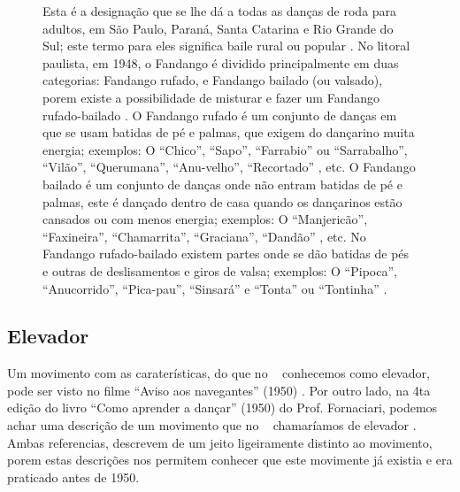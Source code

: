 \begin{figure}[t]
\begin{elaboracion}[title=Fandango]

Esta é a designação que se lhe dá a todas as danças de 
roda para adultos, em São Paulo, Paraná, Santa Catarina e Rio Grande do Sul;
este termo para eles significa baile rural ou popular \cite[pp. 261]{marcondes1977enciclopedia}.
No litoral paulista, em 1948, o Fandango é dividido principalmente em duas categorias: Fandango rufado, 
e Fandango bailado (ou valsado), porem existe a possibilidade de 
misturar e fazer um Fandango rufado-bailado \cite[pp. 48-49]{fandangoSP}.
O Fandango rufado é um conjunto de danças em que se usam batidas de pé e palmas, 
que exigem do dançarino muita energia; exemplos: O ``Chico'', ``Sapo'', 
``Farrabio'' ou ``Sarrabalho'', ``Vilão'', ``Querumana'', ``Anu-velho'', ``Recortado'' \cite[pp. 48-49]{fandangoSP}, 
etc.
O Fandango bailado é um conjunto de danças onde  não entram batidas de pé e palmas,
este é dançado dentro de casa quando os dançarinos estão cansados ou com menos energia;
exemplos: O ``Manjericão'', ``Faxineira'', ``Chamarrita'', ``Graciana'', ``Dandão'' \cite[pp. 49]{fandangoSP}, 
etc.
No Fandango rufado-bailado existem partes onde se dão batidas de pés e outras de deslisamentos e giros de valsa;
exemplos: O ``Pipoca'', ``Anucorrido'', ``Pica-pau'', ``Sinsará'' e ``Tonta'' ou ``Tontinha'' \cite[pp. 49]{fandangoSP}.


\end{elaboracion}
\label{fig:fandango}
\end{figure}

\subsection{Elevador}
\label{def:PassoElevador}

Um movimento com as caraterísticas, do que no \AnoLivro~ conhecemos como elevador, 
pode ser visto no filme ``Aviso aos navegantes'' (1950) \cite[min. 40:35]{AtlantidaDance}.
Por outro lado, na 4ta edição do livro ``Como aprender a dançar'' (1950) do Prof. Fornaciari,
podemos achar uma descrição de um movimento que no \AnoLivro~ chamaríamos de elevador \cite[pp. 161]{fornaciari1950aprender}.
Ambas referencias, descrevem de um jeito ligeiramente distinto ao movimento,
porem estas descrições nos permitem conhecer que este movimente já existia e era 
praticado antes de 1950.

